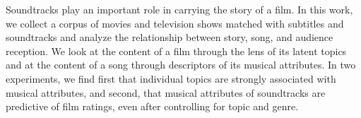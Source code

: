 Soundtracks play an important role in carrying the story of a film. In this work, we collect a corpus of movies and television shows matched with subtitles and soundtracks and analyze the relationship between story, song, and audience reception. We look at the content of a film through the lens of its latent topics and at the content of a song through descriptors of its musical attributes. In two experiments, we find first that individual topics are strongly associated with musical attributes, and second, that musical attributes of soundtracks are predictive of film ratings, even after controlling for topic and genre.
